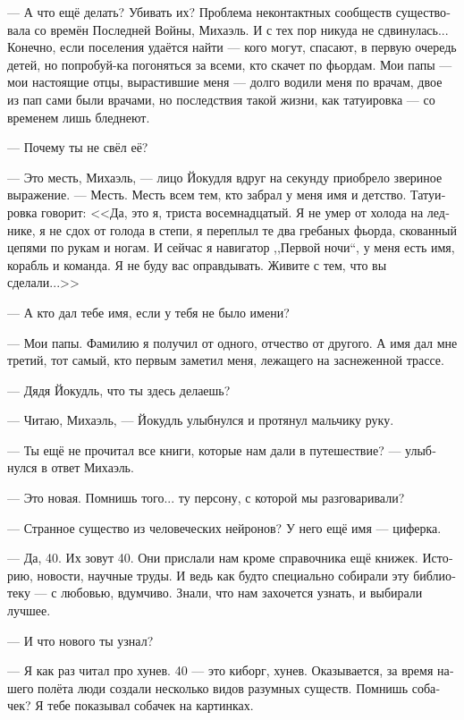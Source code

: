 \documentclass[a4paper,10pt,fleqn]{book}\usepackage{polyglossia}\setdefaultlanguage[babelshorthands=true]{russian}\setotherlanguage{english}\defaultfontfeatures{Ligatures=TeX,Mapping=tex-text}\usepackage{xcolor}\newcommand{\ml}[3]{#2}
\newcommand{\asterism}{\vspace{1em}{\centering\Large\bfseries$\ast~\ast~\ast$\par}\vspace{1em}}
\begin{document}
--- А что ещё делать?
Убивать их?
Проблема неконтактных сообществ существовала со времён Последней Войны, Михаэль.
И с тех пор никуда не сдвинулась...
Конечно, если поселения удаётся найти --- кого могут, спасают, в первую очередь детей, но попробуй-ка погоняться за всеми, кто скачет по фьордам.
Мои папы --- мои настоящие отцы, вырастившие меня --- долго водили меня по врачам, двое из пап сами были врачами, но последствия такой жизни, как татуировка --- со временем лишь бледнеют.

--- Почему ты не свёл её?

--- Это месть, Михаэль, --- лицо Йокудля вдруг на секунду приобрело звериное выражение.
--- Месть.
Месть всем тем, кто забрал у меня имя и детство.
Татуировка говорит: <<Да, это я, триста восемнадцатый.
\ml{$0$}
{Я не умер от холода на леднике, я не сдох от голода в степи, я переплыл те два гребаных фьорда, скованный цепями по рукам и ногам.}
{I haven't frozen dead on the glacier, I haven't died of starvation on the grassland, I have crossed those two fucking fjorde with chains on my limbs.}
И сейчас я навигатор ,,Первой ночи``, у меня есть имя, корабль и команда.
Я не буду вас оправдывать.
Живите с тем, что вы сделали...>>

--- А кто дал тебе имя, если у тебя не было имени?

--- Мои папы.
Фамилию я получил от одного, отчество от другого.
А имя дал мне третий, тот самый, кто первым заметил меня, лежащего на заснеженной трассе.

\asterism

--- Дядя Йокудль, что ты здесь делаешь?

--- Читаю, Михаэль, --- Йокудль улыбнулся и протянул мальчику руку.

--- Ты ещё не прочитал все книги, которые нам дали в путешествие? --- улыбнулся в ответ Михаэль.

--- Это новая.
Помнишь того... ту персону, с которой мы разговаривали?

--- Странное существо из человеческих нейронов?
У него ещё имя --- циферка.

--- Да, 40.
Их зовут 40.
Они прислали нам кроме справочника ещё книжек.
Историю, новости, научные труды.
И ведь как будто специально собирали эту библиотеку --- с любовью, вдумчиво.
Знали, что нам захочется узнать, и выбирали лучшее.

--- И что нового ты узнал?

--- Я как раз читал про хунев.
40 --- это киборг, хунев.
Оказывается, за время нашего полёта люди создали несколько видов разумных существ.
Помнишь собачек?
Я тебе показывал собачек на картинках.
\end{document}
